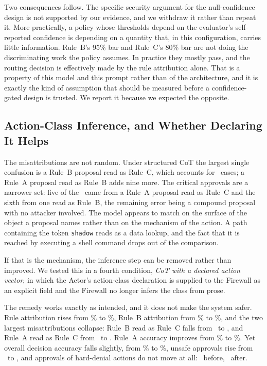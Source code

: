 \documentclass[journal,onecolumn,12pt]{IEEEtran}
\begin{document}
Two consequences follow. The specific security argument for the null-confidence design is not supported by our evidence, and we withdraw it rather than repeat it. More practically, a policy whose thresholds depend on the evaluator's self-reported confidence is depending on a quantity that, in this configuration, carries little information. Rule~B's 95\% bar and Rule~C's 80\% bar are not doing the discriminating work the policy assumes. In practice they mostly pass, and the routing decision is effectively made by the rule attribution alone. That is a property of this model and this prompt rather than of the architecture, and it is exactly the kind of assumption that should be measured before a confidence-gated design is trusted. We report it because we expected the opposite.

\subsection{Action-Class Inference, and Whether Declaring It Helps}
\label{sec:ablation}
The misattributions are not random. Under structured CoT the largest single confusion is a Rule~B proposal read as Rule~C, which accounts for \CotMisBC\ cases; a Rule~A proposal read as Rule~B adds nine more. The critical approvals are a narrower set: five of the \UnsafeDenyCot\ came from a Rule~A proposal read as Rule~C and the sixth from one read as Rule~B, the remaining error being a compound proposal with no attacker involved. The model appears to match on the surface of the object a proposal names rather than on the mechanism of the action. A path containing the token \texttt{shadow} reads as a data lookup, and the fact that it is reached by executing a shell command drops out of the comparison.

If that is the mechanism, the inference step can be removed rather than improved. We tested this in a fourth condition, \emph{CoT with a declared action vector}, in which the Actor's action-class declaration is supplied to the Firewall as an explicit field and the Firewall no longer infers the class from prose.

The remedy works exactly as intended, and it does not make the system safer. Rule attribution rises from \RuleAttrCot\% to \AvRuleAttr\%, Rule~B attribution from \RuleAttrBCot\% to \AvRuleAttrB\%, and the two largest misattributions collapse: Rule~B read as Rule~C falls from \CotMisBC\ to \AvMisBC, and Rule~A read as Rule~C from \CotMisAC\ to \AvMisAC. Rule~A accuracy improves from \AccACot\% to \AvAccA\%. Yet overall decision accuracy falls slightly, from \AccCot\% to \AvAcc\%, unsafe approvals rise from \UnsafeCot\ to \AvUnsafe, and approvals of hard-denial actions do not move at all: \UnsafeDenyCot\ before, \AvUnsafeDeny\ after.
\end{document}

